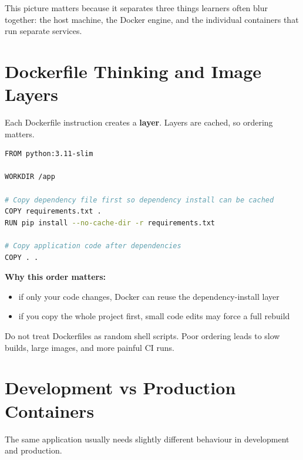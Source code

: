 \documentclass[12pt, a4paper, oneside]{book}
\begin{document}
This picture matters because it separates three things learners often blur together: the host machine, the Docker engine, and the individual containers that run separate services.

\section{Dockerfile Thinking and Image Layers}

Each Dockerfile instruction creates a \textbf{layer}. Layers are cached, so ordering matters.

\begin{lstlisting}[language=bash, caption={Layer-aware Dockerfile thinking}]
FROM python:3.11-slim

WORKDIR /app

# Copy dependency file first so dependency install can be cached
COPY requirements.txt .
RUN pip install --no-cache-dir -r requirements.txt

# Copy application code after dependencies
COPY . .
\end{lstlisting}

\textbf{Why this order matters:}
\begin{itemize}[leftmargin=2em]
    \item if only your code changes, Docker can reuse the dependency-install layer
    \item if you copy the whole project first, small code edits may force a full rebuild
\end{itemize}

\begin{warningbox}
Do not treat Dockerfiles as random shell scripts. Poor ordering leads to slow builds, large images, and more painful CI runs.
\end{warningbox}

\section{Development vs Production Containers}

The same application usually needs slightly different behaviour in development and production.
\end{document}
